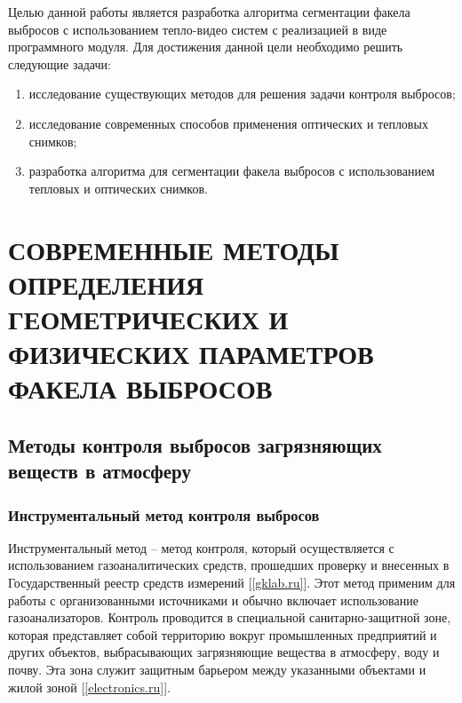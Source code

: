 \documentclass[14pt, a4paper]{extreport}
\begin{document}
	Целью данной работы является разработка алгоритма сегментации факела выбросов с использованием тепло-видео систем с реализацией в виде программного модуля. Для достижения данной цели необходимо решить следующие задачи:
	\begin{enumerate}[label={\arabic*)}]
		\item исследование существующих методов для решения задачи контроля выбросов;
		\item исследование современных способов применения оптических и тепловых снимков;
		\item разработка алгоритма для сегментации факела выбросов с использованием тепловых и оптических снимков.
	\end{enumerate}
	
\chapter [\vspace*{-0.22cm}СОВРЕМЕННЫЕ МЕТОДЫ ОПРЕДЕЛЕНИЯ ГЕОМЕТРИЧЕСКИХ \hspace*{-0.5cm} И ФИЗИЧЕСКИХ ПАРАМЕТРОВ ФАКЕЛА ВЫБРОСОВ]{\vspace*{-0.22cm}СОВРЕМЕННЫЕ МЕТОДЫ ОПРЕДЕЛЕНИЯ ГЕОМЕТРИЧЕСКИХ И ФИЗИЧЕСКИХ ПАРАМЕТРОВ ФАКЕЛА ВЫБРОСОВ}
\section {Методы контроля выбросов загрязняющих веществ в атмосферу}
\subsection {Инструментальный метод контроля выбросов}
	Инструментальный метод -- метод контроля, который осуществляется с использованием газоаналитических средств, прошедших проверку и внесенных в Государственный реестр средств измерений [\ref{gklab.ru}]. Этот метод применим для работы с организованными источниками и обычно включает использование газоанализаторов. Контроль проводится в специальной санитарно-защитной зоне, которая представляет собой территорию вокруг промышленных предприятий и других объектов, выбрасывающих загрязняющие вещества в атмосферу, воду и почву. Эта зона служит защитным барьером между указанными объектами и жилой зоной [\ref{electronics.ru}].
	
\end{document}
